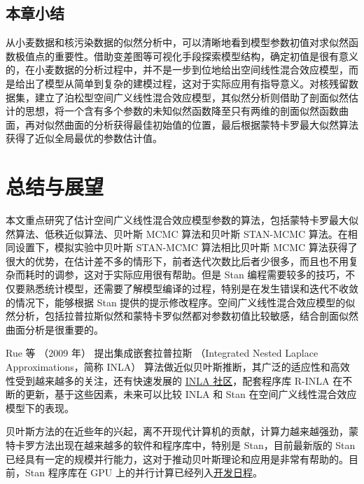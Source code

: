 \documentclass[12pt,a4paper,UTF8,twoside]{book}
\theoremstyle{definition}
\theoremstyle{definition}
\theoremstyle{definition}
\theoremstyle{remark}
\begin{document}
\hypertarget{sec:cases}{%
\section{本章小结}\label{sec:cases}}

从小麦数据和核污染数据的似然分析中，可以清晰地看到模型参数初值对求似然函数极值点的重要性。借助变差图等可视化手段探索模型结构，确定初值是很有意义的，在小麦数据的分析过程中，并不是一步到位地给出空间线性混合效应模型，而是给出了模型从简单到复杂的建模过程，这对于实际应用有指导意义。对核残留数据集，建立了泊松型空间广义线性混合效应模型，其似然分析则借助了剖面似然估计的思想，将一个含有多个参数的未知似然函数降至只有两维的剖面似然函数曲面，再对似然曲面的分析获得最佳初始值的位置，最后根据蒙特卡罗最大似然算法获得了近似全局最优的参数估计值。

\hypertarget{summary}{%
\chapter{总结与展望}\label{summary}}

本文重点研究了估计空间广义线性混合效应模型参数的算法，包括蒙特卡罗最大似然算法、低秩近似算法、贝叶斯
MCMC 算法和贝叶斯 STAN-MCMC 算法。在相同设置下，模拟实验中贝叶斯
STAN-MCMC 算法相比贝叶斯 MCMC
算法获得了很大的优势，在估计差不多的情形下，前者迭代次数比后者少很多，而且也不用复杂而耗时的调参，这对于实际应用很有帮助。但是
Stan
编程需要较多的技巧，不仅要熟悉统计模型，还需要了解模型编译的过程，特别是在发生错误和迭代不收敛的情况下，能够根据
Stan
提供的提示修改程序。空间广义线性混合效应模型的似然分析，包括拉普拉斯似然和蒙特卡罗似然都对参数初值比较敏感，结合剖面似然曲面分析是很重要的。

Rue 等 （2009 年） \citep{Rue2009} 提出集成嵌套拉普拉斯 （Integrated
Nested Laplace Approximations，简称 INLA）
算法做近似贝叶斯推断，其广泛的适应性和高效性受到越来越多的关注，还有快速发展的
\href{http://www.r-inla.org/}{INLA 社区}，配套程序库 R-INLA
在不断的更新，基于这些因素，未来可以比较 INLA 和 Stan
在空间广义线性混合效应模型下的表现。

贝叶斯方法的在近些年的兴起，离不开现代计算机的贡献，计算力越来越强劲，蒙特卡罗方法出现在越来越多的软件和程序库中，特别是
Stan，目前最新版的 Stan
已经具有一定的规模并行能力，这对于推动贝叶斯理论和应用是非常有帮助的。目前，Stan
程序库在 GPU
上的并行计算已经列入\href{https://github.com/stan-dev/stan/wiki/Longer-Term-To-Do-List}{开发日程}。

\setlength{\bibsep}{0ex}

\end{document}
